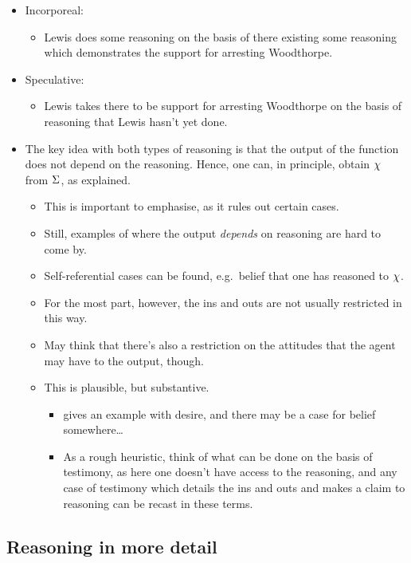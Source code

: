\documentclass[10pt]{article}
\begin{document}
\begin{itemize}
\item Incorporeal:
  \begin{itemize}
  \item Lewis does some reasoning on the basis of there existing some reasoning which demonstrates the support for arresting Woodthorpe.
  \end{itemize}
\item Speculative:
  \begin{itemize}
  \item Lewis takes there to be support for arresting Woodthorpe on the basis of reasoning that Lewis hasn't yet done.
  \end{itemize}
\item The key idea with both types of reasoning is that the output of the function does not depend on the reasoning.
  Hence, one can, in principle, obtain \(\chi\) from \(\Sigma\), as explained.
  \begin{itemize}
  \item This is important to emphasise, as it rules out certain cases.
  \item Still, examples of where the output \emph{depends} on reasoning are hard to come by.
  \item Self-referential cases can be found, e.g.\ belief that one has reasoned to \(\chi\).
  \item For the most part, however, the ins and outs are not usually restricted in this way.
  \item May think that there's also a restriction on the attitudes that the agent may have to the output, though.
  \item This is plausible, but substantive.
    \begin{itemize}
    \item \citeauthor{Sinhababu:2017aa} gives an example with desire, and there may be a case for belief somewhere\dots
    \item As a rough heuristic, think of what can be done on the basis of testimony, as here one doesn't have access to the reasoning, and any case of testimony which details the ins and outs and makes a claim to reasoning can be recast in these terms.
    \end{itemize}
  \end{itemize}
\end{itemize}

\subsection{Reasoning in more detail}
\label{sec:reas-more-deta}
\end{document}
